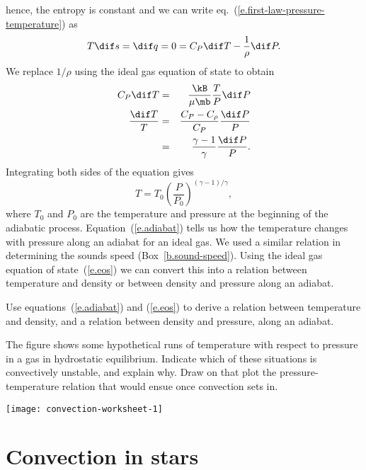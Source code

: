 hence, the entropy is constant and we can write eq.~(\ref{e.first-law-pressure-temperature}) as
\begin{equation}\label{e.differential-entropy}
    T\dif s = \dif q = 0 = C_{P}\dif T - \frac{1}{\rho} \dif P.
\end{equation}
We replace $1/\rho$ using the ideal gas equation of state
to obtain
\begin{eqnarray}
     C_{P}\dif T &=& \frac{\kB}{\mu\mb}\frac{T}{P}\dif P \nonumber\\
     \frac{\dif T}{T} &=& \frac{C_{P}-C_{\rho}}{C_{P}} \frac{\dif P}{P}\nonumber\\
	&=& \frac{\gamma-1}{\gamma}\frac{\dif P}{P}.
\label{e.differential-adiabat}
\end{eqnarray}
Integrating both sides of the equation gives
\begin{equation}\label{e.adiabat}
 T = T_{0}\left(\frac{P}{P_{0}}\right)^{(\gamma-1)/\gamma},
\end{equation}
where $T_{0}$ and $P_{0}$ are the temperature and pressure at the beginning of the adiabatic process. Equation~(\ref{e.adiabat}) tells us how the temperature changes with pressure along an adiabat for an ideal gas. We used a similar relation in determining the sounds speed (Box~\ref{b.sound-speed}). Using the ideal gas equation of state~(\ref{e.eos}) we can convert this into a relation between temperature and density or between density and pressure along an adiabat.

\begin{exercisebox}
Use equations~(\ref{e.adiabat}) and (\ref{e.eos}) to derive a relation between temperature and density, and a relation between density and pressure, along an adiabat.
\end{exercisebox}

\begin{exercisebox}
The figure shows some hypothetical runs of temperature with respect to pressure in a gas in hydrostatic equilibrium.  Indicate which of these situations is convectively unstable, and explain why. Draw on that plot the pressure-temperature relation that would ensue once convection sets in.

\texttt{[image: convection-worksheet-1]}
\end{exercisebox}

\section{Convection in stars}
\label{s.convection-in-stars}

